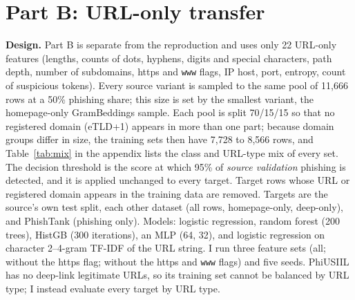 \documentclass[10pt]{article}
\begin{document}
\begin{table}[t]
\centering
\caption{Feature-group ablation with HistGB, mean of three seeds: AUROC / accuracy.}
\label{tab:shortcut}

\end{table}

\section{Part B: URL-only transfer}\label{sec:partb}
\textbf{Design.} Part B is separate from the reproduction and uses only 22 URL-only features (lengths, counts of dots, hyphens, digits and special characters, path depth, number of subdomains, https and \texttt{www} flags, IP host, port, entropy, count of suspicious tokens). Every source variant is sampled to the same pool of 11,666 rows at a 50\% phishing share; this size is set by the smallest variant, the homepage-only GramBeddings sample. Each pool is split 70/15/15 so that no registered domain (eTLD+1) appears in more than one part; because domain groups differ in size, the training sets then have 7,728 to 8,566 rows, and Table~\ref{tab:mix} in the appendix lists the class and URL-type mix of every set. The decision threshold is the score at which 95\% of \emph{source validation} phishing is detected, and it is applied unchanged to every target. Target rows whose URL or registered domain appears in the training data are removed. Targets are the source's own test split, each other dataset (all rows, homepage-only, deep-only), and PhishTank (phishing only). Models: logistic regression, random forest (200 trees), HistGB (300 iterations), an MLP (64, 32), and logistic regression on character 2--4-gram TF-IDF of the URL string. I run three feature sets (all; without the https flag; without the https and \texttt{www} flags) and five seeds. PhiUSIIL has no deep-link legitimate URLs, so its training set cannot be balanced by URL type; I instead evaluate every target by URL type.
\end{document}
